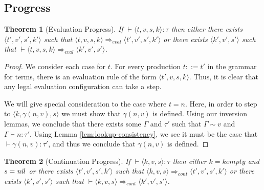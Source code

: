 \documentclass{article}
\newtheorem{theorem}{Theorem}
\begin{document}
\subsection{Progress}

\begin{theorem}[Evaluation Progress]
  If $\vdash \langle t, v, s, k \rangle : \tau$ then either there
  exists $\langle t', v', s', k' \rangle$ such that $\langle t,
  v, s, k \rangle \Rightarrow_\mathit{eval} \langle t', v', s', k'
  \rangle$ or there exists $\langle k', v', s' \rangle$ such that
  $\vdash \langle t, v, s, k \rangle \Rightarrow_\mathit{eval} \langle
  k', v', s' \rangle$.
\end{theorem}

\begin{proof}
  We consider each case for $t$.  For every production $t ::= t'$ in
  the grammar for terms, there is an evaluation rule of the form
  $\langle t', v, s, k \rangle$. Thus, it is clear that any legal
  evaluation configuration can take a step.

  We will give special consideration to the case where $t = n$. Here,
  in order to step to $\langle k, \gamma(n, v), s \rangle$ we must
  show that $\gamma(n, v)$ is defined. Using our inversion lemmas, we
  conclude that there exists some $\Gamma$ and $\tau'$ such that
  $\Gamma \sim v$ and $\Gamma \vdash n : \tau'$. Using Lemma
  \ref{lem:lookup-consistency}, we see it must be the case that
  $\vdash \gamma(n, v) : \tau'$, and thus we conclude that $\gamma(n,
  v)$ is defined.
\end{proof}

\begin{theorem}[Continuation Progress]
  If $\vdash \langle k, v, s \rangle : \tau$ then either $k =
  \mathit{kempty}$ and $s = \mathit{nil}$ or there exists $\langle t', v',
  s', k' \rangle$ such that $\langle k, v, s \rangle
  \Rightarrow_\mathit{cont} \langle t', v', s', k' \rangle$ or there
  exists $\langle k', v', s' \rangle$ such that $\vdash \langle k, v,
  s \rangle \Rightarrow_\mathit{cont} \langle k', v', s' \rangle$.
\end{theorem}
\end{document}
